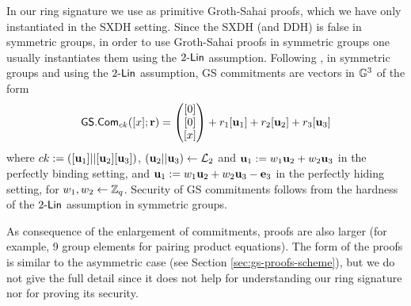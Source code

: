 In our ring signature we use as primitive Groth-Sahai proofs, which we have only instantiated in the SXDH setting. Since the SXDH (and DDH) is false in symmetric groups, in order to use Groth-Sahai proofs in symmetric groups one usually instantiates them using the $2\mbox{-}\mathsf{Lin}$ assumption. Following \cite{EC:GroSah08}, in symmetric groups and using the $2\mbox{-}\mathsf{Lin}$ assumption, GS commitments are vectors in $\mathbb{G}^3$ of the form
$$
{\mathsf{GS}}.\mathsf{Com}_{ck}([x];\mathbf{r})=\left(\begin{matrix}{[0]}\\{[0]}\\{[x]}\end{matrix}\right)+r_1[\mathbf{u}_1]+{r}_2[\mathbf{u}_2]+r_3[\mathbf{u}_3]
$$
where $ck:=([\mathbf{u}_1]||[\mathbf{u}_2][\mathbf{u}_3])$, $(\mathbf{u}_2||\mathbf{u}_3)\gets\mathcal{L}_2$ and $\mathbf{u}_1:=w_1\mathbf{u}_2+w_2\mathbf{u}_3$ in the perfectly binding setting, and $\mathbf{u}_1:=w_1\mathbf{u}_2+w_2\mathbf{u}_3-\mathbf{e}_3$ in the perfectly hiding setting, for $w_1,w_2\gets\mathbb{Z}_q$. Security of GS commitments follows from the hardness of the $2\mbox{-}\mathsf{Lin}$ assumption in symmetric groups.

As consequence of the enlargement of commitments, proofs are also larger (for example, 9 group elements for pairing product equations). The form of the proofs is similar  to the asymmetric case (see Section \ref{sec:gs-proofs-scheme}), but we do not give the full detail since it does not help for understanding our ring signature nor for proving its security. 


